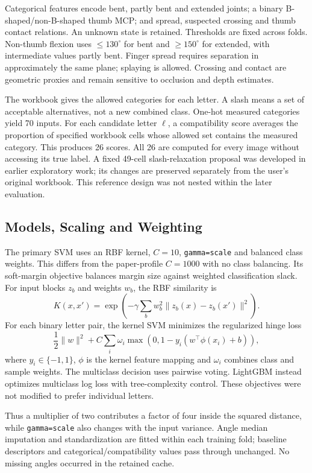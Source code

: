 Categorical features encode bent, partly bent and extended joints; a binary B-shaped/non-B-shaped thumb MCP; and spread, suspected crossing and thumb contact relations. An unknown state is retained. Thresholds are fixed across folds. Non-thumb flexion uses $\leq130^\circ$ for bent and $\geq150^\circ$ for extended, with intermediate values partly bent. Finger spread requires separation in approximately the same plane; splaying is allowed. Crossing and contact are geometric proxies and remain sensitive to occlusion and depth estimates.

The workbook gives the allowed categories for each letter. A slash means a set of acceptable alternatives, not a new combined class. One-hot measured categories yield 70 inputs. For each candidate letter $\ell$, a compatibility score averages the proportion of specified workbook cells whose allowed set contains the measured category. This produces 26 scores. All 26 are computed for every image without accessing its true label. A fixed 49-cell slash-relaxation proposal was developed in earlier exploratory work; its changes are preserved separately from the user's original workbook. This reference design was not nested within the later evaluation.

\subsection{Models, Scaling and Weighting}
The primary SVM uses an RBF kernel, $C=10$, \texttt{gamma=scale} and balanced class weights. This differs from the paper-profile $C=1000$ with no class balancing. Its soft-margin objective balances margin size against weighted classification slack. For input blocks $z_b$ and weights $w_b$, the RBF similarity is
\begin{equation}
K(x,x')=\exp\!\left(-\gamma\sum_b w_b^2\|z_b(x)-z_b(x')\|^2\right).
\end{equation}
For each binary letter pair, the kernel SVM minimizes the regularized hinge loss
\[
\frac12\|w\|^2+C\sum_i\omega_i\max(0,1-y_i(w^\top\phi(x_i)+b)),
\]
where $y_i\in\{-1,1\}$, $\phi$ is the kernel feature mapping and $\omega_i$ combines class and sample weights. The multiclass decision uses pairwise voting. LightGBM instead optimizes multiclass log loss with tree-complexity control. These objectives were not modified to prefer individual letters.

Thus a multiplier of two contributes a factor of four inside the squared distance, while \texttt{gamma=scale} also changes with the input variance. Angle median imputation and standardization are fitted within each training fold; baseline descriptors and categorical/compatibility values pass through unchanged. No missing angles occurred in the retained cache.

